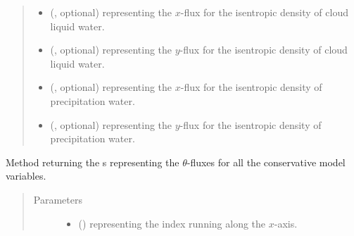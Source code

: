 \documentclass[letterpaper,10pt,english]{sphinxmanual}
\begin{document}
\begin{fulllineitems}
\begin{fulllineitems}
\begin{quote}
\begin{description}
\begin{itemize}
\item {} 
 (, optional) \textendash{}  representing the \(x\)-flux for the isentropic density of cloud liquid water.

\item {} 
 (, optional) \textendash{}  representing the \(y\)-flux for the isentropic density of cloud liquid water.

\item {} 
 (, optional) \textendash{}  representing the \(x\)-flux for the isentropic density of precipitation water.

\item {} 
 (, optional) \textendash{}  representing the \(y\)-flux for the isentropic density of precipitation water.

\end{itemize}


\end{description}\end{quote}

\end{fulllineitems}


\begin{fulllineitems}
\label{\detokenize{api:tasmania.dycore.flux_isentropic.FluxIsentropic.get_vertical_fluxes}}
Method returning the s representing the \(\theta\)-fluxes for all the conservative
model variables.
\begin{quote}\begin{description}
\item[{Parameters}] \leavevmode\begin{itemize}
\item {} 
 () \textendash{}  representing the index running along the \(x\)-axis.


\end{itemize}
\end{description}
\end{quote}
\end{fulllineitems}
\end{fulllineitems}
\end{document}
